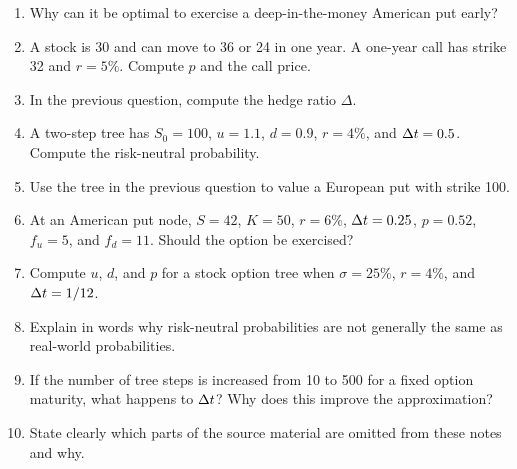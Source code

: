 \begin{enumerate}
    when the stock pays no dividends?
    \item Why can it be optimal to exercise a deep-in-the-money American put
    early?
    \item A stock is 30 and can move to 36 or 24 in one year. A one-year call
    has strike 32 and $r=5\%$. Compute $p$ and the call price.
    \item In the previous question, compute the hedge ratio $\Delta$.
    \item A two-step tree has $S_0=100$, $u=1.1$, $d=0.9$, $r=4\%$, and
    $\Delta t=0.5$. Compute the risk-neutral probability.
    \item Use the tree in the previous question to value a European put with
    strike 100.
    \item At an American put node, $S=42$, $K=50$, $r=6\%$, $\Delta t=0.25$,
    $p=0.52$, $f_u=5$, and $f_d=11$. Should the option be exercised?
    \item Compute $u$, $d$, and $p$ for a stock option tree when
    $\sigma=25\%$, $r=4\%$, and $\Delta t=1/12$.
    \item Explain in words why risk-neutral probabilities are not generally the
    same as real-world probabilities.
    \item If the number of tree steps is increased from 10 to 500 for a fixed
    option maturity, what happens to $\Delta t$? Why does this improve the
    approximation?
    \item State clearly which parts of the source material are omitted from
    these notes and why.
\end{enumerate}


